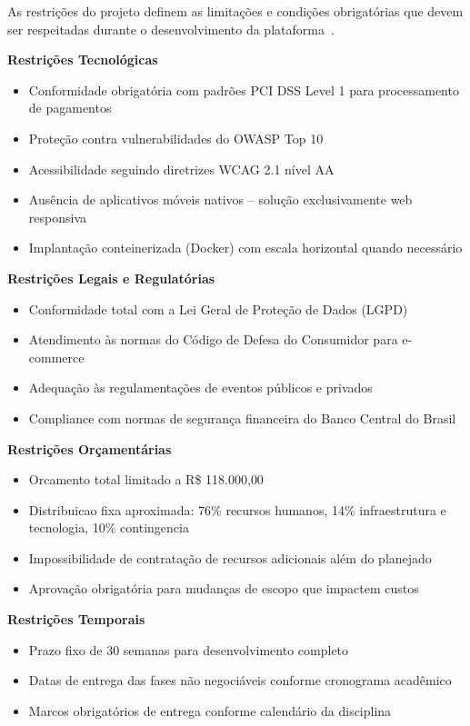 As restrições do projeto definem as limitações e condições obrigatórias que devem ser respeitadas durante o desenvolvimento da plataforma~\cite{Sommerville:2016}.

\textbf{Restrições Tecnológicas}
\begin{itemize}
    \item Conformidade obrigatória com padrões PCI DSS Level 1 para processamento de pagamentos~\cite{PCIDSS:2022}
    \item Proteção contra vulnerabilidades do OWASP Top 10~\cite{OWASP:2021}
    \item Acessibilidade seguindo diretrizes WCAG 2.1 nível AA~\cite{WCAG:2018}
    \item Ausência de aplicativos móveis nativos -- solução exclusivamente web responsiva
    \item Implantação conteinerizada (Docker) com escala horizontal quando necessário
\end{itemize}

\textbf{Restrições Legais e Regulatórias}
\begin{itemize}
    \item Conformidade total com a Lei Geral de Proteção de Dados (LGPD)~\cite{LGPD:2018}
    \item Atendimento às normas do Código de Defesa do Consumidor para e-commerce
    \item Adequação às regulamentações de eventos públicos e privados
    \item Compliance com normas de segurança financeira do Banco Central do Brasil
\end{itemize}

\textbf{Restrições Orçamentárias}
\begin{itemize}
    \item Orcamento total limitado a R\$ 118.000{,}00
    \item Distribuicao fixa aproximada: 76\% recursos humanos, 14\% infraestrutura e tecnologia, 10\% contingencia
    \item Impossibilidade de contratação de recursos adicionais além do planejado
    \item Aprovação obrigatória para mudanças de escopo que impactem custos
\end{itemize}

\textbf{Restrições Temporais}
\begin{itemize}
    \item Prazo fixo de 30 semanas para desenvolvimento completo
    \item Datas de entrega das fases não negociáveis conforme cronograma acadêmico
    \item Marcos obrigatórios de entrega conforme calendário da disciplina
\end{itemize}

